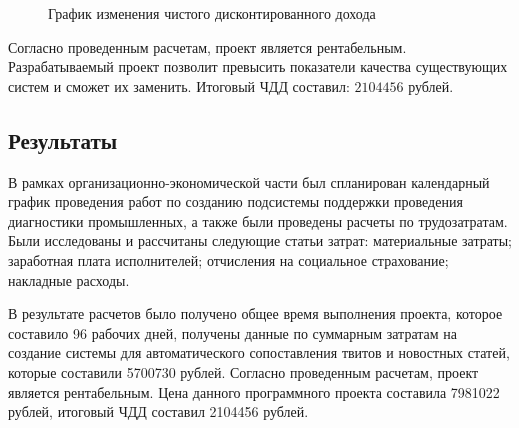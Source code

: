         \begin{figure}[h!]
            \centering
            \caption{График изменения чистого дисконтированного дохода}
            \label{pic:pdd}
        \end{figure}

        Согласно проведенным расчетам, проект является рентабельным.
        Разрабатываемый проект позволит превысить показатели качества существующих систем и сможет их заменить.
        Итоговый ЧДД составил: $2104456$ рублей.

    \subsection{Результаты}
        В рамках организационно-экономической части был спланирован календарный график проведения работ по созданию подсистемы поддержки проведения диагностики промышленных, а также были проведены расчеты по трудозатратам.
        Были исследованы и рассчитаны следующие статьи затрат: материальные затраты; заработная плата исполнителей; отчисления на социальное страхование; накладные расходы.

        В результате расчетов было получено общее время выполнения проекта, которое составило 96 рабочих дней, получены данные по суммарным затратам на создание системы для автоматического сопоставления твитов и новостных статей, которые составили 5700730 рублей.
        Согласно проведенным расчетам, проект является рентабельным.
        Цена данного программного проекта составила 7981022 рублей, итоговый ЧДД составил 2104456 рублей.

